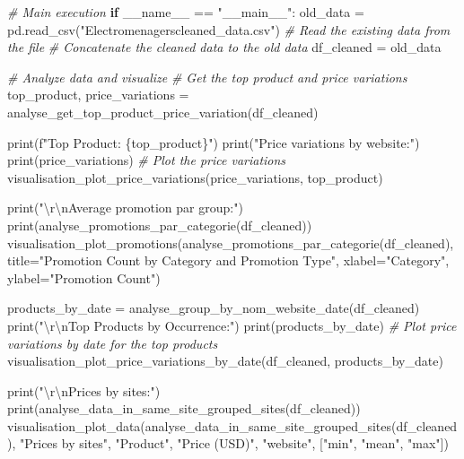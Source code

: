 \documentclass[
]{article}
\newenvironment{Shaded}{}{}
\newcommand{\BuiltInTok}[1]{\textcolor[rgb]{0.00,0.50,0.00}{#1}}
\newcommand{\CharTok}[1]{\textcolor[rgb]{0.25,0.44,0.63}{#1}}
\newcommand{\CommentTok}[1]{\textcolor[rgb]{0.38,0.63,0.69}{\textit{#1}}}
\newcommand{\ControlFlowTok}[1]{\textcolor[rgb]{0.00,0.44,0.13}{\textbf{#1}}}
\newcommand{\NormalTok}[1]{#1}
\newcommand{\OperatorTok}[1]{\textcolor[rgb]{0.40,0.40,0.40}{#1}}
\newcommand{\SpecialCharTok}[1]{\textcolor[rgb]{0.25,0.44,0.63}{#1}}
\newcommand{\SpecialStringTok}[1]{\textcolor[rgb]{0.73,0.40,0.53}{#1}}
\newcommand{\StringTok}[1]{\textcolor[rgb]{0.25,0.44,0.63}{#1}}
\newcommand{\VariableTok}[1]{\textcolor[rgb]{0.10,0.09,0.49}{#1}}
\begin{document}
\hypertarget{fd147109-32b0-47ee-bbe5-ec4918089d61}{}
\begin{Shaded}
\begin{Highlighting}[]
\CommentTok{\# Main execution}
\ControlFlowTok{if} \VariableTok{\_\_name\_\_} \OperatorTok{==} \StringTok{"\_\_main\_\_"}\NormalTok{:}
\NormalTok{    old\_data }\OperatorTok{=}\NormalTok{ pd.read\_csv(}\StringTok{"Electromenagerscleaned\_data.csv"}\NormalTok{)  }\CommentTok{\# Read the existing data from the file}
    \CommentTok{\# Concatenate the cleaned data to the old data}
\NormalTok{    df\_cleaned }\OperatorTok{=}\NormalTok{ old\_data}

    \CommentTok{\# Analyze data and visualize}
    \CommentTok{\# Get the top product and price variations}
\NormalTok{    top\_product, price\_variations }\OperatorTok{=}\NormalTok{ analyse\_get\_top\_product\_price\_variation(df\_cleaned)}
    
    \BuiltInTok{print}\NormalTok{(}\SpecialStringTok{f"Top Product: }\SpecialCharTok{\{}\NormalTok{top\_product}\SpecialCharTok{\}}\SpecialStringTok{"}\NormalTok{)}
    \BuiltInTok{print}\NormalTok{(}\StringTok{"Price variations by website:"}\NormalTok{)}
    \BuiltInTok{print}\NormalTok{(price\_variations)}
    \CommentTok{\# Plot the price variations}
\NormalTok{    visualisation\_plot\_price\_variations(price\_variations, top\_product)}
    
    
    \BuiltInTok{print}\NormalTok{(}\StringTok{"}\CharTok{\textbackslash{}r\textbackslash{}n}\StringTok{Average promotion par group:"}\NormalTok{)}
    \BuiltInTok{print}\NormalTok{(analyse\_promotions\_par\_categorie(df\_cleaned))}
\NormalTok{    visualisation\_plot\_promotions(analyse\_promotions\_par\_categorie(df\_cleaned), }
\NormalTok{        title}\OperatorTok{=}\StringTok{"Promotion Count by Category and Promotion Type"}\NormalTok{, }
\NormalTok{        xlabel}\OperatorTok{=}\StringTok{"Category"}\NormalTok{, }
\NormalTok{        ylabel}\OperatorTok{=}\StringTok{"Promotion Count"}\NormalTok{)}
    
    
\NormalTok{    products\_by\_date }\OperatorTok{=}\NormalTok{ analyse\_group\_by\_nom\_website\_date(df\_cleaned)}
    \BuiltInTok{print}\NormalTok{(}\StringTok{"}\CharTok{\textbackslash{}r\textbackslash{}n}\StringTok{Top Products by Occurrence:"}\NormalTok{)}
    \BuiltInTok{print}\NormalTok{(products\_by\_date)}
    \CommentTok{\# Plot price variations by date for the top products}
\NormalTok{    visualisation\_plot\_price\_variations\_by\_date(df\_cleaned, products\_by\_date)}
    
    
    \BuiltInTok{print}\NormalTok{(}\StringTok{"}\CharTok{\textbackslash{}r\textbackslash{}n}\StringTok{Prices by sites:"}\NormalTok{)}
    \BuiltInTok{print}\NormalTok{(analyse\_data\_in\_same\_site\_grouped\_sites(df\_cleaned))}
\NormalTok{    visualisation\_plot\_data(analyse\_data\_in\_same\_site\_grouped\_sites(df\_cleaned), }\StringTok{"Prices by sites"}\NormalTok{, }\StringTok{"Product"}\NormalTok{, }\StringTok{"Price (USD)"}\NormalTok{, }\StringTok{"website"}\NormalTok{, [}\StringTok{"min"}\NormalTok{, }\StringTok{"mean"}\NormalTok{, }\StringTok{"max"}\NormalTok{])}
\end{Highlighting}
\end{Shaded}
\end{document}
